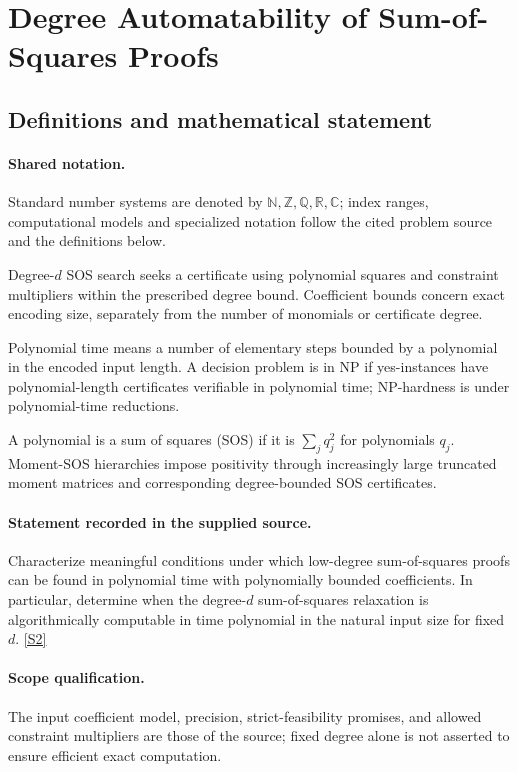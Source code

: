\documentclass[11pt]{article}
\newcommand{\sref}[2]{\hyperlink{source:#1:#2}{[S#2]}}
\begin{document}
\section{Degree Automatability of Sum-of-Squares Proofs}\label{statement}

\subsection{Definitions and mathematical statement}

\paragraph{Shared notation.}Standard number systems are denoted by $\mathbb N,\mathbb Z,\mathbb Q,\mathbb R,\mathbb C$; index ranges, computational models and specialized notation follow the cited problem source and the definitions below.


Degree-$d$ SOS search seeks a certificate using polynomial squares and constraint multipliers within the prescribed degree bound. Coefficient bounds concern exact encoding size, separately from the number of monomials or certificate degree.

Polynomial time means a number of elementary steps bounded by a polynomial in the encoded input length. A decision problem is in $\mathrm{NP}$ if yes-instances have polynomial-length certificates verifiable in polynomial time; NP-hardness is under polynomial-time reductions.

A polynomial is a sum of squares (SOS) if it is $\sum_j q_j^2$ for polynomials $q_j$. Moment-SOS hierarchies impose positivity through increasingly large truncated moment matrices and corresponding degree-bounded SOS certificates.
\paragraph{Statement recorded in the supplied source.}
Characterize meaningful conditions under which low-degree sum-of-squares proofs can be found in polynomial time with polynomially bounded coefficients. In particular, determine when the degree-$d$ sum-of-squares relaxation is algorithmically computable in time polynomial in the natural input size for fixed $d$. \sref{statement}{2}
\paragraph{Scope qualification.}
The input coefficient model, precision, strict-feasibility promises, and allowed constraint multipliers are those of the source; fixed degree alone is not asserted to ensure efficient exact computation.
\end{document}
